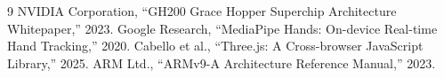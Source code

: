 \documentclass[12pt, a4paper]{article}
\begin{document}
\begin{thebibliography}{9}
 NVIDIA Corporation, ``GH200 Grace Hopper Superchip Architecture Whitepaper,'' 2023.
 Google Research, ``MediaPipe Hands: On-device Real-time Hand Tracking,'' 2020.
 Cabello et al., ``Three.js: A Cross-browser JavaScript Library,'' 2025.
 ARM Ltd., ``ARMv9-A Architecture Reference Manual,'' 2023.
\end{thebibliography}
\end{document}
